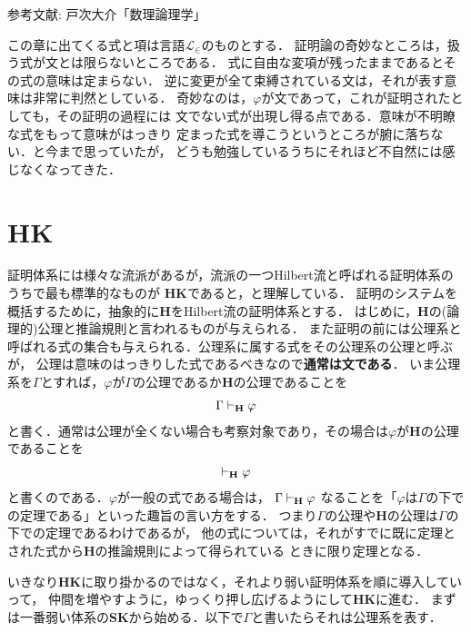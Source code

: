	\begin{flushleft}
		参考文献: 戸次大介「数理論理学」
	\end{flushleft}
	
	この章に出てくる式と項は言語$\mathcal{L}_{\in}$のものとする．
	証明論の奇妙なところは，扱う式が文とは限らないところである．
	式に自由な変項が残ったままであるとその式の意味は定まらない．
	逆に変更が全て束縛されている文は，それが表す意味は非常に判然としている．
	奇妙なのは，$\varphi$が文であって，これが証明されたとしても，その証明の過程には
	文でない式が出現し得る点である．意味が不明瞭な式をもって意味がはっきり
	定まった式を導こうというところが腑に落ちない．と今まで思っていたが，
	どうも勉強しているうちにそれほど不自然には感じなくなってきた．
	

\section{{\bf HK}}
	証明体系には様々な流派があるが，流派の一つHilbert流と呼ばれる証明体系のうちで最も標準的なものが
	{\bf HK}であると，と理解している．
	証明のシステムを概括するために，抽象的に{\bf H}をHilbert流の証明体系とする．
	はじめに，{\bf H}の(論理的)公理と推論規則と言われるものが与えられる．
	また証明の前には公理系と呼ばれる式の集合も与えられる．公理系に属する式をその公理系の公理と呼ぶが，
	公理は意味のはっきりした式であるべきなので{\bf 通常は文である}．
	いま公理系を$\Gamma$とすれば，$\varphi$が$\Gamma$の公理であるか{\bf H}の公理であることを
	\begin{align}
		\Gamma \vdash_{{\scriptsize \mbox{{\bf H}}}} \varphi
	\end{align}
	と書く．通常は公理が全くない場合も考察対象であり，その場合は$\varphi$が{\bf H}の公理であることを
	\begin{align}
		\vdash_{{\scriptsize \mbox{{\bf H}}}} \varphi
	\end{align}
	と書くのである．$\varphi$が一般の式である場合は，
	$\Gamma \vdash_{{\scriptsize \mbox{{\bf H}}}} \varphi$
	なることを「$\varphi$は$\Gamma$の下での定理である」といった趣旨の言い方をする．
	つまり$\Gamma$の公理や{\bf H}の公理は$\Gamma$の下での定理であるわけであるが，
	他の式については，それがすでに既に定理とされた式から{\bf H}の推論規則によって得られている
	ときに限り定理となる．
	
	いきなり{\bf HK}に取り掛かるのではなく，それより弱い証明体系を順に導入していって，
	仲間を増やすように，ゆっくり押し広げるようにして{\bf HK}に進む．
	まずは一番弱い体系の{\bf SK}から始める．以下で$\Gamma$と書いたらそれは公理系を表す．
	
